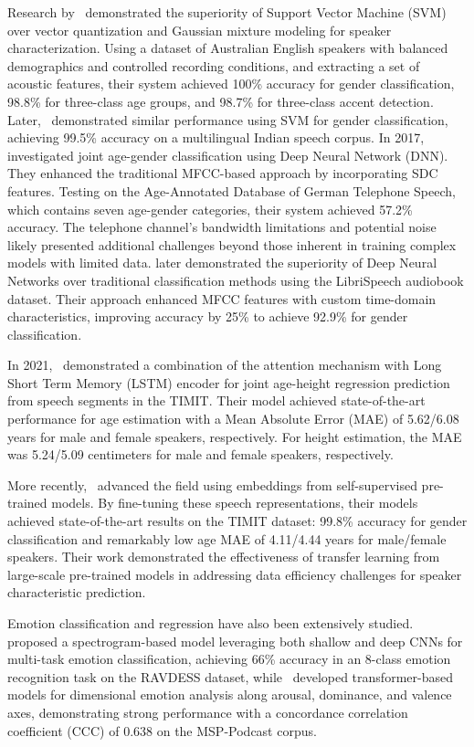 Research by~\citet{5670700} demonstrated the superiority of Support Vector Machine (SVM) over vector quantization and Gaussian mixture modeling for speaker characterization. Using a dataset of Australian English speakers with balanced demographics and controlled recording conditions, and extracting a set of acoustic features, their system achieved 100\% accuracy for gender classification, 98.8\% for three-class age groups, and 98.7\% for three-class accent detection. Later,~\citet{gupta2016support} demonstrated similar performance using SVM for gender classification, achieving 99.5\% accuracy on a multilingual Indian speech corpus.
In 2017,~\citet{qawaqneh2017dnn} investigated joint age-gender classification using Deep Neural Network (DNN). They enhanced the traditional MFCC-based approach by incorporating SDC features. Testing on the Age-Annotated Database of German Telephone Speech, which contains seven age-gender categories, their system achieved 57.2\% accuracy. The telephone channel's bandwidth limitations and potential noise likely presented additional challenges beyond those inherent in training complex models with limited data.
\citet{jahangir2020text} later demonstrated the superiority of Deep Neural Networks over traditional classification methods using the LibriSpeech audiobook dataset. Their approach enhanced MFCC features with custom time-domain characteristics, improving accuracy by 25\% to achieve 92.9\% for gender classification. 

In 2021,~\citet{kaushik2021end} demonstrated a combination of the attention mechanism with Long Short Term Memory (LSTM) encoder for joint age-height regression prediction from speech segments in the TIMIT. Their model achieved state-of-the-art performance for age estimation with a Mean Absolute Error (MAE) of 5.62/6.08 years for male and female speakers, respectively. For height estimation, the MAE was 5.24/5.09 centimeters for male and female speakers, respectively.

More recently,~\citet{lastow2022language} advanced the field using embeddings from self-supervised pre-trained models. By fine-tuning these speech representations, their models achieved state-of-the-art results on the TIMIT dataset: 99.8\% accuracy for gender classification and remarkably low age  MAE of 4.11/4.44 years for male/female speakers. Their work demonstrated the effectiveness of transfer learning from large-scale pre-trained models in addressing data efficiency challenges for speaker characteristic prediction.

Emotion classification and regression have also been extensively studied.~\citet{zeng2019spectrogram} proposed a spectrogram-based model leveraging both shallow and deep CNNs for multi-task emotion classification, achieving 66\% accuracy in an 8-class emotion recognition task on the RAVDESS dataset, while~\citet{wagner2022dawn} developed transformer-based models for dimensional emotion analysis along arousal, dominance, and valence axes, demonstrating strong performance with a concordance correlation coefficient (CCC) of 0.638 on the MSP-Podcast corpus.

